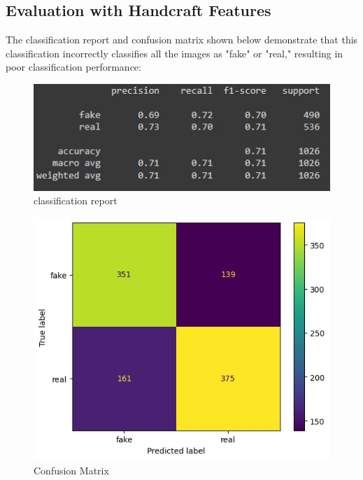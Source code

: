 \documentclass{template}
\begin{document}
\subsection{Evaluation with Handcraft Features}
The classification report and confusion matrix shown below demonstrate that this classification incorrectly classifies all the images as "fake" or "real," resulting in poor classification performance:
\begin{figure}
\includegraphics[scale=0.7]{SVM3.jpg}
\caption{classification report}
\label{fig:logo}
\end{figure}
\begin{figure}
\includegraphics[scale=0.6]{SVM4.jpg}
\caption{Confusion Matrix}
\label{fig:logo}
\end{figure}
\end{document}
